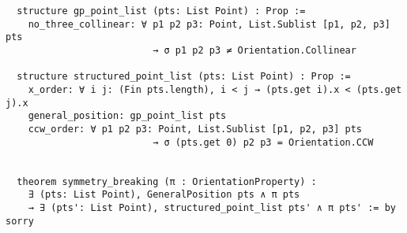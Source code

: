 \begin{lstlisting}
  structure gp_point_list (pts: List Point) : Prop :=
    no_three_collinear: ∀ p1 p2 p3: Point, List.Sublist [p1, p2, p3] pts
                          → σ p1 p2 p3 ≠ Orientation.Collinear
  
  structure structured_point_list (pts: List Point) : Prop :=
    x_order: ∀ i j: (Fin pts.length), i < j → (pts.get i).x < (pts.get j).x
    general_position: gp_point_list pts
    ccw_order: ∀ p1 p2 p3: Point, List.Sublist [p1, p2, p3] pts
                          → σ (pts.get 0) p2 p3 = Orientation.CCW


  theorem symmetry_breaking (π : OrientationProperty) :
    ∃ (pts: List Point), GeneralPosition pts ∧ π pts
    → ∃ (pts': List Point), structured_point_list pts' ∧ π pts' := by sorry


\end{lstlisting}